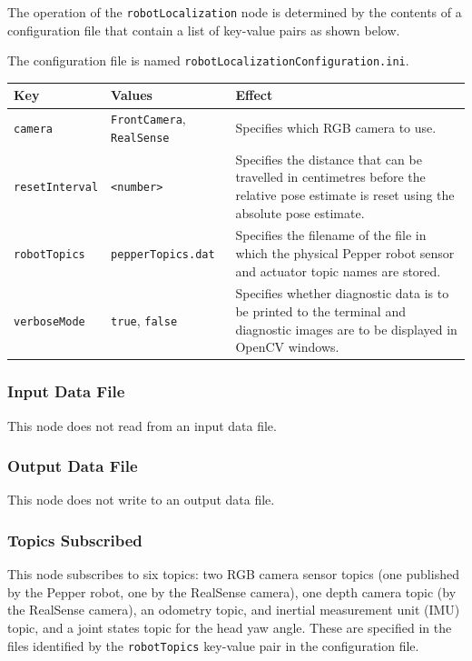 \documentclass{CSSRforAfrica}
\begin{document}
{{The operation of the {\small \verb+robotLocalization+} node is determined by the contents of a configuration file that  contain a list of key-value pairs as shown below.  

\noindent The configuration file is named {\small \verb+robotLocalizationConfiguration.ini+}.

\begin{center}
\begin{tabularx}{\linewidth}{| l | l | X|}
\hline 
{\small Key }                               & {\small Values }                                                 &  {\small Effect}       \\
\hline
{\footnotesize \verb+camera+ }  & {\footnotesize \verb+FrontCamera+, \verb+RealSense+}     & {\small Specifies which RGB camera to use.} \\ 
\hline
{\footnotesize \verb+resetInterval+ }  & {\footnotesize \verb+<number>+}     & {\small Specifies the distance that can be travelled in centimetres before the relative pose estimate is reset using the absolute pose estimate.} \\ 
\hline
{\footnotesize \verb+robotTopics+ }  & {\footnotesize \verb+pepperTopics.dat+}     & {\small Specifies the filename of the file in which the physical Pepper robot sensor and actuator topic names are stored.} \\
\hline
{\footnotesize \verb+verboseMode+}  & {\footnotesize \verb+true+, \verb+false+}     & {\small Specifies whether diagnostic data is to be printed to the terminal and diagnostic images are to be displayed in OpenCV windows.} \\
\hline
\end{tabularx}
\end{center}



\subsubsection*{Input Data File}
This node does not read from an input data file.


\subsubsection*{Output Data File}
This node does not write to an output data file.


\subsubsection*{Topics Subscribed}
This node  subscribes to six topics:  two RGB camera sensor topics (one published by the Pepper robot, one by the RealSense camera), one depth camera topic (by the RealSense camera), an odometry topic, and inertial measurement unit (IMU) topic, and a joint states topic for the head yaw angle. 
These are specified in the files identified by the {\small \verb+robotTopics+ }  key-value pair in the configuration file.


}}
\end{document}
